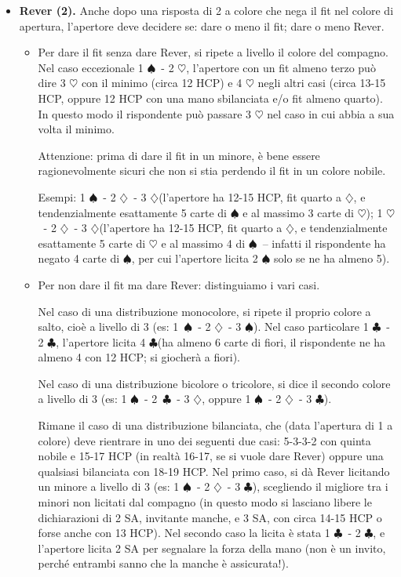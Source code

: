 \documentclass[a4paper,10pt]{article}
\renewcommand{\c}{$\clubsuit$\xspace}
\renewcommand{\d}{$\diamondsuit$\xspace}
\newcommand{\h}{$\heartsuit$\xspace}
\newcommand{\s}{$\spadesuit$\xspace}
\newcommand{\sa}{SA\xspace}
\begin{document}
\begin{itemize}
 Altro esempio: se l'apertore ha meno di 16 HCP, 6 carte di \h e 5 carte di \s, su 1 \h\ - 1 \sa deve rispondere 2 \h e non 2 \s. Questo è un po' triste, però non ci si può fare nulla.
 
 Ulteriore esempio: su 1 \d\ - 1 \s, con la distribuzione 4\d\ - 4\h\ - 3\s\ - 2\c e meno di 16 HCP, l'apertore licita 1 \sa e non 2 \h.
 
 \item {\bf Rever (2).} Anche dopo una risposta di 2 a colore che nega il fit nel colore di apertura, l'apertore deve decidere se: dare o meno il fit; dare o meno Rever.
 \begin{itemize}
  \item Per dare il fit senza dare Rever, si ripete a livello il colore del compagno. Nel caso eccezionale 1 \s\ - 2 \h, l'apertore con un fit almeno terzo può dire 3 \h con il minimo (circa 12 HCP) e 4 \h negli altri casi (circa 13-15 HCP, oppure 12 HCP con una mano sbilanciata e/o fit almeno quarto). In questo modo il rispondente può passare 3 \h nel caso in cui abbia a sua volta il minimo.
  
  Attenzione: prima di dare il fit in un minore, è bene essere ragionevolmente sicuri che non si stia perdendo il fit in un colore nobile.
  
  Esempi: 1 \s\ - 2 \d\ - 3 \d (l'apertore ha 12-15 HCP, fit quarto a \d, e tendenzialmente esattamente 5 carte di \s e al massimo 3 carte di \h);
  1 \h\ - 2 \d\ - 3 \d (l'apertore ha 12-15 HCP, fit quarto a \d, e tendenzialmente esattamente 5 carte di \h e al massimo 4 di \s\ -- infatti il rispondente ha negato 4 carte di \s, per cui l'apertore licita 2 \s solo se ne ha almeno 5).
  
  \item Per non dare il fit ma dare Rever: distinguiamo i vari casi.
  
  Nel caso di una distribuzione monocolore, si ripete il proprio colore a salto, cioè a livello di 3 (es: \mbox{1 \s}\ - 2 \d\ - 3 \s). Nel caso particolare 1 \c\ - 2 \c, l'apertore licita 4 \c (ha almeno 6 carte di fiori, il rispondente ne ha almeno 4 con 12 HCP; si giocherà a fiori).
  
  Nel caso di una distribuzione bicolore o tricolore, si dice il secondo colore a livello di 3 (es: 1 \s\ - \mbox{2 \c}\ - 3 \d, oppure 1 \s\ - 2 \d\ - 3 \c).
  
  Rimane il caso di una distribuzione bilanciata, che (data l'apertura di 1 a colore) deve rientrare in uno dei seguenti due casi: 5-3-3-2 con quinta nobile e 15-17 HCP (in realtà 16-17, se si vuole dare Rever) oppure una qualsiasi bilanciata con 18-19 HCP. Nel primo caso, si dà Rever licitando un minore a livello di 3 (es: 1 \s\ - 2 \d\ - 3 \c), scegliendo il migliore tra i minori non licitati dal compagno (in questo modo si lasciano libere le dichiarazioni di 2 \sa, invitante manche, e 3 \sa, con circa 14-15 HCP o forse anche con 13 HCP).
  Nel secondo caso la licita è stata 1 \c\ - 2 \c, e l'apertore licita 2 \sa per segnalare la forza della mano (non è un invito, perché entrambi sanno che la manche è assicurata!).
  

\end{itemize}
\end{itemize}
\end{document}
